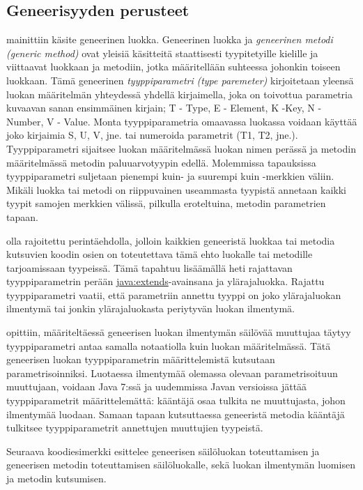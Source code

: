 \documentclass[a4paper,justified,notoc]{tufte-book}
\newcommand{\eng}[1]{\textit{(#1)}}
\newcommand{\new}[1]{\textit{\gls{#1}}}
\newcommand{\neweng}[2]{\new{#1} \eng{#2}}
\newcommand{\java}[1]{\underline{\gls{java:#1}}}
\begin{document}
\begin{fullwidth}
\subsection{Geneerisyyden perusteet}
\label{genericBasics}

  mainittiin käsite \gls{geneerinen luokka}. 
Geneerinen luokka ja \neweng{geneerinen metodi}{generic method} ovat yleisiä käsitteitä
staattisesti tyypitetyille kielille ja viittaavat luokkaan ja metodiin, jotka määritellään
suhteessa johonkin toiseen luokkaan. Tämä geneerinen \neweng{tyyppiparametri}{type paremeter}
kirjoitetaan yleensä luokan määritelmän yhteydessä yhdellä kirjaimella, joka on toivottua
parametria kuvaavan sanan ensimmäinen kirjain; T - Type, E - Element, K -Key, N - Number, V -
Value. Monta tyyppiparametria omaavassa luokassa voidaan käyttää joko kirjaimia S, U, V, jne. tai
numeroida parametrit (T1, T2, jne.). Tyyppiparametri sijaitsee luokan määritelmässä luokan nimen
perässä ja metodin määritelmässä metodin paluuarvotyypin edellä. Molemmissa tapauksissa
tyyppiparametri suljetaan pienempi kuin- ja suurempi kuin -merkkien väliin. Mikäli luokka tai
metodi on riippuvainen useammasta tyypistä annetaan kaikki tyypit samojen merkkien välissä,
pilkulla eroteltuina, metodin parametrien tapaan. 

 olla rajoitettu perintäehdolla, jolloin kaikkien
geneeristä luokkaa tai metodia kutsuvien koodin osien on toteutettava tämä ehto luokalle tai
metodille tarjoamissaan tyypeissä. Tämä tapahtuu lisäämällä heti rajattavan tyyppiparametrin
perään \java{extends}-avainsana ja ylärajaluokka. Rajattu tyyppiparametri vaatii, että parametriin
annettu tyyppi on joko ylärajaluokan ilmentymä tai jonkin ylärajaluokasta periytyvän luokan
ilmentymä.

  opittiin, määriteltäessä geneerisen luokan
ilmentymän säilövää muuttujaa täytyy tyyppiparametri antaa samalla notaatiolla kuin luokan
määritelmässä. Tätä geneerisen luokan tyyppiparametrin määrittelemistä kutsutaan
parametrisoinniksi. Luotaessa ilmentymää olemassa olevaan parametrisoituun muuttujaan, voidaan
Java 7:ssä ja uudemmissa Javan versioissa jättää tyyppiparametrit määrittelemättä: kääntäjä osaa
tulkita ne muuttujasta, johon ilmentymää luodaan. Samaan tapaan kutsuttaessa geneeristä metodia
kääntäjä tulkitsee tyyppiparametrit annettujen muuttujien tyypeistä.

Seuraava koodiesimerkki esittelee
geneerisen säilöluokan toteuttamisen ja geneerisen metodin toteuttamisen säilöluokalle, sekä
luokan ilmentymän luomisen ja metodin kutsumisen.


\end{fullwidth}
\end{document}
